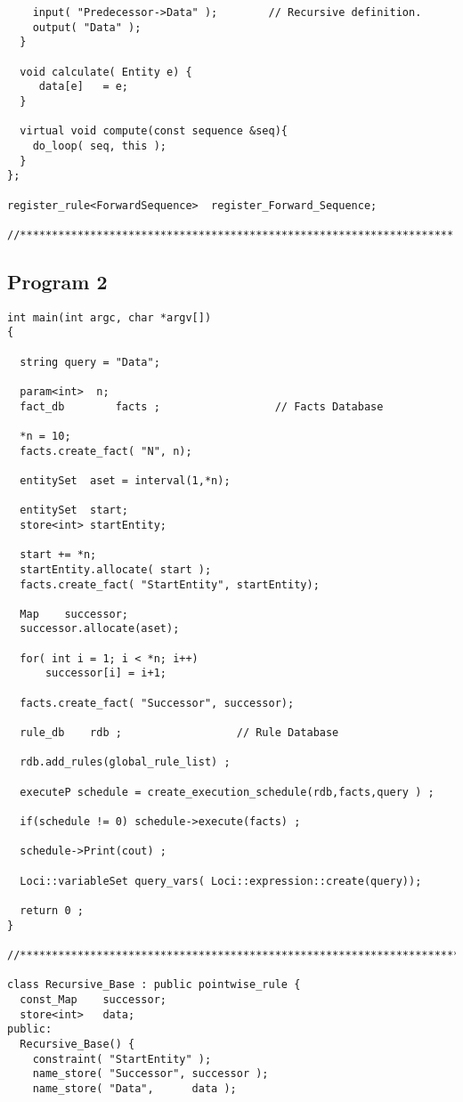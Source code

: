 \begin{verbatim}
    input( "Predecessor->Data" );        // Recursive definition.
    output( "Data" );
  }

  void calculate( Entity e) {
     data[e]   = e;
  }

  virtual void compute(const sequence &seq){
    do_loop( seq, this );
  }
};

register_rule<ForwardSequence>  register_Forward_Sequence;

//********************************************************************
\end{verbatim}

\subsection { Program 2 }

\begin{verbatim}
int main(int argc, char *argv[]) 
{
  
  string query = "Data";

  param<int>  n;
  fact_db        facts ;	              // Facts Database
  
  *n = 10;
  facts.create_fact( "N", n);

  entitySet  aset = interval(1,*n);

  entitySet  start;
  store<int> startEntity;

  start += *n;
  startEntity.allocate( start );
  facts.create_fact( "StartEntity", startEntity);

  Map    successor;
  successor.allocate(aset);

  for( int i = 1; i < *n; i++)
      successor[i] = i+1;

  facts.create_fact( "Successor", successor);

  rule_db    rdb ;                  // Rule Database
  
  rdb.add_rules(global_rule_list) ;

  executeP schedule = create_execution_schedule(rdb,facts,query ) ;

  if(schedule != 0) schedule->execute(facts) ;

  schedule->Print(cout) ;
  
  Loci::variableSet query_vars( Loci::expression::create(query));
  
  return 0 ;
}

//*********************************************************************

class Recursive_Base : public pointwise_rule {
  const_Map    successor;
  store<int>   data;
public:
  Recursive_Base() {
    constraint( "StartEntity" );
    name_store( "Successor", successor );
    name_store( "Data",      data );


\end{verbatim}
